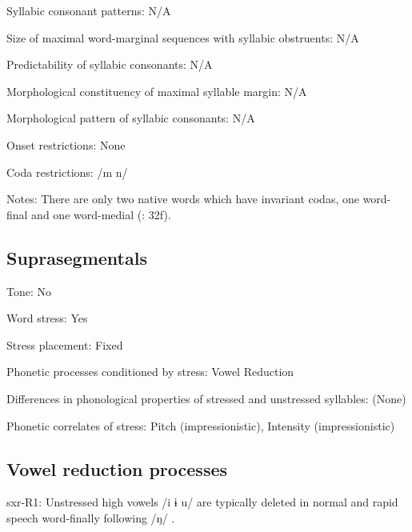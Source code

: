 {\begin{appendixdesc}
\item[Syllabic consonant patterns:] N/A

\item[Size of maximal word-marginal sequences with syllabic obstruents:] N/A

\item[Predictability of syllabic consonants:] N/A

\item[Morphological constituency of maximal syllable margin:] N/A

\item[Morphological pattern of syllabic consonants:] N/A

\item[Onset restrictions:] None

\item[Coda restrictions:] /m n/

\item[Notes:] There are only two native words which have invariant codas, one word-final and one word-medial (\citealt{Pan2012}: 32f).
\end{appendixdesc}
\subsection*{Suprasegmentals}
\begin{appendixdesc}
\item[Tone:] No

\item[Word stress:] Yes

\item[Stress placement:] Fixed

\item[Phonetic processes conditioned by stress:] Vowel Reduction

\item[Differences in phonological properties of stressed and unstressed syllables:] (None)

\item[Phonetic correlates of stress:] Pitch (impressionistic), Intensity (impressionistic)
\end{appendixdesc}
\subsection*{Vowel reduction processes}
\begin{appendixdesc}

\item[sxr-R1:] Unstressed high vowels /i ɨ u/ are typically deleted in normal and rapid speech word-finally following /ŋ/ \citep[38]{Pan2012}.


\end{appendixdesc}}
